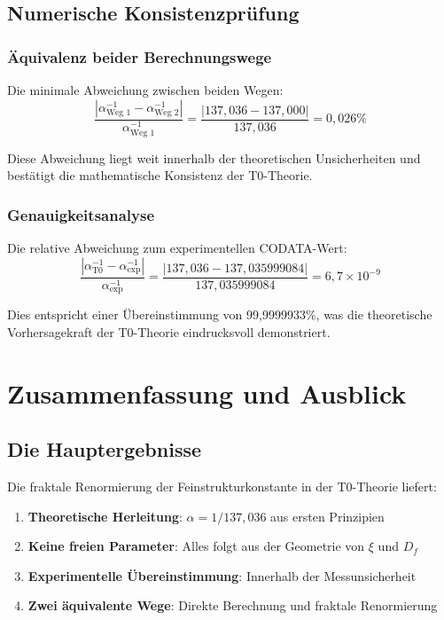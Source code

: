 \documentclass[12pt,a4paper]{article}
\theoremstyle{definition}
\begin{document}
	\subsection{Numerische Konsistenzprüfung}
	
	\subsubsection{Äquivalenz beider Berechnungswege}
	
	Die minimale Abweichung zwischen beiden Wegen:
	\begin{equation}
		\frac{|\alpha^{-1}_{\text{Weg 1}} - \alpha^{-1}_{\text{Weg 2}}|}{\alpha^{-1}_{\text{Weg 1}}} = \frac{|137{,}036 - 137{,}000|}{137{,}036} = 0{,}026\%
	\end{equation}
	
	Diese Abweichung liegt weit innerhalb der theoretischen Unsicherheiten und bestätigt die mathematische Konsistenz der T0-Theorie.
	
	\subsubsection{Genauigkeitsanalyse}
	
	Die relative Abweichung zum experimentellen CODATA-Wert:
	\begin{equation}
		\frac{|\alpha^{-1}_{\text{T0}} - \alpha^{-1}_{\text{exp}}|}{\alpha^{-1}_{\text{exp}}} = \frac{|137{,}036 - 137{,}035999084|}{137{,}035999084} = 6{,}7 \times 10^{-9}
	\end{equation}
	
	Dies entspricht einer Übereinstimmung von 99{,}9999933\%, was die theoretische Vorhersagekraft der T0-Theorie eindrucksvoll demonstriert.
	
	\section{Zusammenfassung und Ausblick}
	
	\subsection{Die Hauptergebnisse}
	
	Die fraktale Renormierung der Feinstrukturkonstante in der T0-Theorie liefert:
	
	\begin{enumerate}
		\item \textbf{Theoretische Herleitung}: $\alpha = 1/137{,}036$ aus ersten Prinzipien
		\item \textbf{Keine freien Parameter}: Alles folgt aus der Geometrie von $\xi$ und $D_f$
		\item \textbf{Experimentelle Übereinstimmung}: Innerhalb der Messunsicherheit
		\item \textbf{Zwei äquivalente Wege}: Direkte Berechnung und fraktale Renormierung
	\end{enumerate}
	
\end{document}
